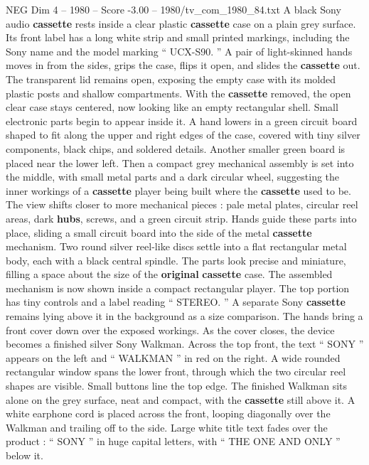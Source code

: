 \begin{textsample}{NEG Dim 4 – 1980 – Score -3.00 – 1980/tv\_com\_1980\_84.txt}  \label{ex:f4_neg_051}
A black Sony audio \textbf{cassette} rests inside a clear plastic \textbf{cassette} case on a plain grey surface.
Its front label has a long white strip and small printed markings, including the Sony name and the model marking “ UCX-S90. ” A pair of light-skinned hands moves in from the sides, grips the case, flips it open, and slides the \textbf{cassette} out.
The transparent lid remains open, exposing the empty case with its molded plastic posts and shallow compartments.
With the \textbf{cassette} removed, the open clear case stays centered, now looking like an empty rectangular shell.
Small electronic parts begin to appear inside it.
A hand lowers in a green circuit board shaped to fit along the upper and right edges of the case, covered with tiny silver components, black chips, and soldered details.
Another smaller green board is placed near the lower left.
Then a compact grey mechanical assembly is set into the middle, with small metal parts and a dark circular wheel, suggesting the inner workings of a \textbf{cassette} player being built where the \textbf{cassette} used to be.
The view shifts closer to more mechanical pieces : pale metal plates, circular reel areas, dark \textbf{hubs}, screws, and a green circuit strip.
Hands guide these parts into place, sliding a small circuit board into the side of the metal \textbf{cassette} mechanism.
Two round silver reel-like discs settle into a flat rectangular metal body, each with a black central spindle.
The parts look precise and miniature, filling a space about the size of the \textbf{original} \textbf{cassette} case.
The assembled mechanism is now shown inside a compact rectangular player.
The top portion has tiny controls and a label reading “ STEREO. ” A separate Sony \textbf{cassette} remains lying above it in the background as a size comparison.
The hands bring a front cover down over the exposed workings.
As the cover closes, the device becomes a finished silver Sony Walkman.
Across the top front, the text “ SONY ” appears on the left and “ WALKMAN ” in red on the right.
A wide rounded rectangular window spans the lower front, through which the two circular reel shapes are visible.
Small buttons line the top edge.
The finished Walkman sits alone on the grey surface, neat and compact, with the \textbf{cassette} still above it.
A white earphone cord is placed across the front, looping diagonally over the Walkman and trailing off to the side.
Large white title text fades over the product : “ SONY ” in huge capital letters, with “ THE ONE AND ONLY ” below it.

\end{textsample}
